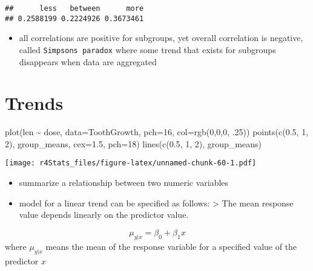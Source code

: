 \documentclass[
]{book}
\newenvironment{Shaded}{\begin{snugshade}}{\end{snugshade}}
\newcommand{\AttributeTok}[1]{\textcolor[rgb]{0.77,0.63,0.00}{#1}}
\newcommand{\DecValTok}[1]{\textcolor[rgb]{0.00,0.00,0.81}{#1}}
\newcommand{\FloatTok}[1]{\textcolor[rgb]{0.00,0.00,0.81}{#1}}
\newcommand{\FunctionTok}[1]{\textcolor[rgb]{0.00,0.00,0.00}{#1}}
\newcommand{\NormalTok}[1]{#1}
\newcommand{\SpecialCharTok}[1]{\textcolor[rgb]{0.00,0.00,0.00}{#1}}
\providecommand{\tightlist}{%
  \setlength{\itemsep}{0pt}\setlength{\parskip}{0pt}}
\theoremstyle{definition}
\theoremstyle{definition}
\theoremstyle{definition}
\theoremstyle{definition}
\theoremstyle{remark}
\begin{document}
\begin{verbatim}
##      less   between      more 
## 0.2588199 0.2224926 0.3673461
\end{verbatim}

\begin{itemize}
\tightlist
\item
  all correlations are positive for subgroups, yet overall correlation is negative, called \texttt{Simpson\textquotesingle{}s\ paradox} where some trend that exists for subgroups disappears when data are aggregated
\end{itemize}

\hypertarget{trends}{%
\section{Trends}\label{trends}}

\begin{Shaded}
\begin{Highlighting}[]
\FunctionTok{plot}\NormalTok{(len }\SpecialCharTok{\textasciitilde{}}\NormalTok{ dose, }\AttributeTok{data=}\NormalTok{ToothGrowth, }\AttributeTok{pch=}\DecValTok{16}\NormalTok{, }\AttributeTok{col=}\FunctionTok{rgb}\NormalTok{(}\DecValTok{0}\NormalTok{,}\DecValTok{0}\NormalTok{,}\DecValTok{0}\NormalTok{, .}\DecValTok{25}\NormalTok{))}
\FunctionTok{points}\NormalTok{(}\FunctionTok{c}\NormalTok{(}\FloatTok{0.5}\NormalTok{, }\DecValTok{1}\NormalTok{, }\DecValTok{2}\NormalTok{), group\_means, }\AttributeTok{cex=}\FloatTok{1.5}\NormalTok{, }\AttributeTok{pch=}\DecValTok{18}\NormalTok{)}
\FunctionTok{lines}\NormalTok{(}\FunctionTok{c}\NormalTok{(}\FloatTok{0.5}\NormalTok{, }\DecValTok{1}\NormalTok{, }\DecValTok{2}\NormalTok{), group\_means)}
\end{Highlighting}
\end{Shaded}

\texttt{[image: r4Stats\_files/figure-latex/unnamed-chunk-60-1.pdf]}

\begin{itemize}
\tightlist
\item
  summarize a relationship between two numeric variables
\item
  model for a linear trend can be specified as follows:
  \textgreater{} The mean response value depends linearly on the predictor value.
\end{itemize}

\[
\mu_{y|x}=\beta_0+\beta_1x 
\]
where \(\mu_{y|x}\) means the mean of the response variable for a specified value of the predictor \(x\)
\end{document}
